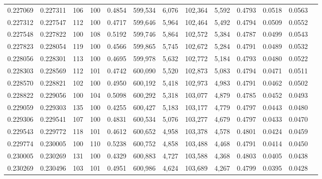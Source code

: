 \begin{tabular}{rrrrrrrrrrrrr}
0.227069 & 0.227311 &   106 & 100 &                                     0.4854 & 599,534 &   6,076 & 102,364 &   5,592 & 0.4793 & 0.0518 & 0.0563 \\
0.227312 & 0.227547 &   112 & 100 &                                     0.4717 & 599,646 &   5,964 & 102,464 &   5,492 & 0.4794 & 0.0509 & 0.0552 \\
0.227548 & 0.227822 &   100 & 108 &                                     0.5192 & 599,746 &   5,864 & 102,572 &   5,384 & 0.4787 & 0.0499 & 0.0543 \\
0.227823 & 0.228054 &   119 & 100 &                                     0.4566 & 599,865 &   5,745 & 102,672 &   5,284 & 0.4791 & 0.0489 & 0.0532 \\
0.228056 & 0.228301 &   113 & 100 &                                     0.4695 & 599,978 &   5,632 & 102,772 &   5,184 & 0.4793 & 0.0480 & 0.0522 \\
0.228303 & 0.228569 &   112 & 101 &                                     0.4742 & 600,090 &   5,520 & 102,873 &   5,083 & 0.4794 & 0.0471 & 0.0511 \\
0.228570 & 0.228821 &   102 & 100 &                                     0.4950 & 600,192 &   5,418 & 102,973 &   4,983 & 0.4791 & 0.0462 & 0.0502 \\
0.228822 & 0.229056 &   100 & 104 &                                     0.5098 & 600,292 &   5,318 & 103,077 &   4,879 & 0.4785 & 0.0452 & 0.0493 \\
0.229059 & 0.229303 &   135 & 100 &                                     0.4255 & 600,427 &   5,183 & 103,177 &   4,779 & 0.4797 & 0.0443 & 0.0480 \\
0.229306 & 0.229541 &   107 & 100 &                                     0.4831 & 600,534 &   5,076 & 103,277 &   4,679 & 0.4797 & 0.0433 & 0.0470 \\
0.229543 & 0.229772 &   118 & 101 &                                     0.4612 & 600,652 &   4,958 & 103,378 &   4,578 & 0.4801 & 0.0424 & 0.0459 \\
0.229774 & 0.230005 &   100 & 110 &                                     0.5238 & 600,752 &   4,858 & 103,488 &   4,468 & 0.4791 & 0.0414 & 0.0450 \\
0.230005 & 0.230269 &   131 & 100 &                                     0.4329 & 600,883 &   4,727 & 103,588 &   4,368 & 0.4803 & 0.0405 & 0.0438 \\
0.230269 & 0.230496 &   103 & 101 &                                     0.4951 & 600,986 &   4,624 & 103,689 &   4,267 & 0.4799 & 0.0395 & 0.0428 \\

\end{tabular}
